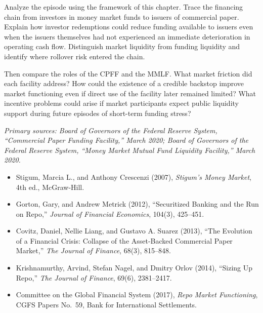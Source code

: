 Analyze the episode using the framework of this chapter. Trace the financing chain from investors in money market funds to issuers of commercial paper. Explain how investor redemptions could reduce funding available to issuers even when the issuers themselves had not experienced an immediate deterioration in operating cash flow. Distinguish market liquidity from funding liquidity and identify where rollover risk entered the chain.

Then compare the roles of the CPFF and the MMLF. What market friction did each facility address? How could the existence of a credible backstop improve market functioning even if direct use of the facility later remained limited? What incentive problems could arise if market participants expect public liquidity support during future episodes of short-term funding stress?

\emph{Primary sources: Board of Governors of the Federal Reserve System, ``Commercial Paper Funding Facility,'' March 2020; Board of Governors of the Federal Reserve System, ``Money Market Mutual Fund Liquidity Facility,'' March 2020.}



\begin{itemize}

\item Stigum, Marcia L., and Anthony Crescenzi (2007),
\emph{Stigum's Money Market}, 4th ed., McGraw-Hill.

\item Gorton, Gary, and Andrew Metrick (2012),
``Securitized Banking and the Run on Repo,''
\emph{Journal of Financial Economics}, 104(3), 425--451.

\item Covitz, Daniel, Nellie Liang, and Gustavo A. Suarez (2013),
``The Evolution of a Financial Crisis: Collapse of the Asset-Backed Commercial Paper Market,''
\emph{The Journal of Finance}, 68(3), 815--848.

\item Krishnamurthy, Arvind, Stefan Nagel, and Dmitry Orlov (2014),
``Sizing Up Repo,''
\emph{The Journal of Finance}, 69(6), 2381--2417.

\item Committee on the Global Financial System (2017),
\emph{Repo Market Functioning},
CGFS Papers No.~59, Bank for International Settlements.

\end{itemize}

